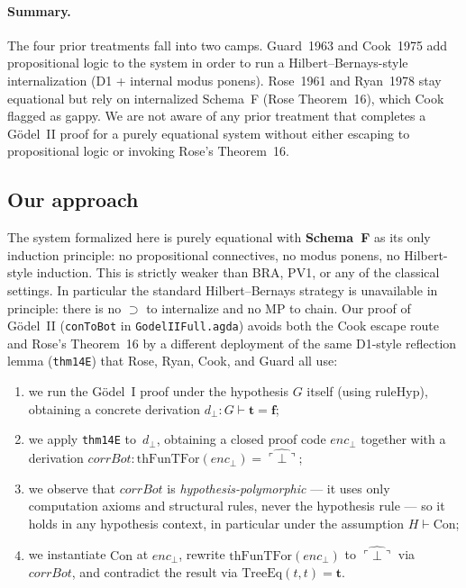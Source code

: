 \documentclass[11pt]{article}
\newcommand{\trueT}{\mathbf{t}}
\newcommand{\falseT}{\mathbf{f}}
\newcommand{\SchemaF}{\textbf{Schema~F}}
\newcommand{\code}[1]{\ulcorner #1 \urcorner}
\newcommand{\reify}[1]{\widehat{#1}}
\newcommand{\thFunTFor}{\mathrm{thFunTFor}}
\newcommand{\TreeEq}{\mathrm{TreeEq}}
\begin{document}
\paragraph{Summary.}
The four prior treatments fall into two camps.
Guard~1963 and Cook~1975 add propositional logic to the
system in order to run a Hilbert--Bernays-style internalization
(D1 + internal modus ponens).  Rose~1961 and Ryan~1978 stay
equational but rely on internalized Schema~F (Rose Theorem~16),
which Cook flagged as gappy.  We are not aware of any prior
treatment that completes a G\"odel~II proof for a purely
equational system without either escaping to propositional
logic or invoking Rose's Theorem~16.

\subsection*{Our approach}

The system formalized here is purely equational with
\SchemaF{} as its only induction principle: no propositional
connectives, no modus ponens, no Hilbert-style induction.
This is strictly weaker than BRA, PV1, or any of the
classical settings.  In particular the standard
Hilbert--Bernays strategy is unavailable in principle:
there is no $\supset$ to internalize and no MP to chain.
Our proof of G\"odel~II (\texttt{conToBot} in
\texttt{GodelIIFull.agda}) avoids both the Cook escape route
and Rose's Theorem~16 by a different deployment of the same
D1-style reflection lemma (\texttt{thm14E}) that Rose, Ryan,
Cook, and Guard all use:

\begin{enumerate}
\item we run the G\"odel~I proof under the hypothesis $G$
  itself (using $\mathrm{ruleHyp}$), obtaining a concrete
  derivation $d_\bot : G \vdash \trueT = \falseT$;
\item we apply \texttt{thm14E} to~$d_\bot$, obtaining a
  closed proof code $\mathit{enc}_\bot$ together with a
  derivation $\mathit{corrBot} : \thFunTFor(\mathit{enc}_\bot)
  = \reify{\code{\bot}}$;
\item we observe that $\mathit{corrBot}$ is
  \emph{hypothesis-polymorphic} --- it uses only computation
  axioms and structural rules, never the hypothesis rule ---
  so it holds in any hypothesis context, in particular
  under the assumption $H \vdash \mathrm{Con}$;
\item we instantiate $\mathrm{Con}$ at $\mathit{enc}_\bot$,
  rewrite $\thFunTFor(\mathit{enc}_\bot)$ to
  $\reify{\code{\bot}}$ via $\mathit{corrBot}$, and contradict
  the result via $\TreeEq(t,t) = \trueT$.
\end{enumerate}
\end{document}
